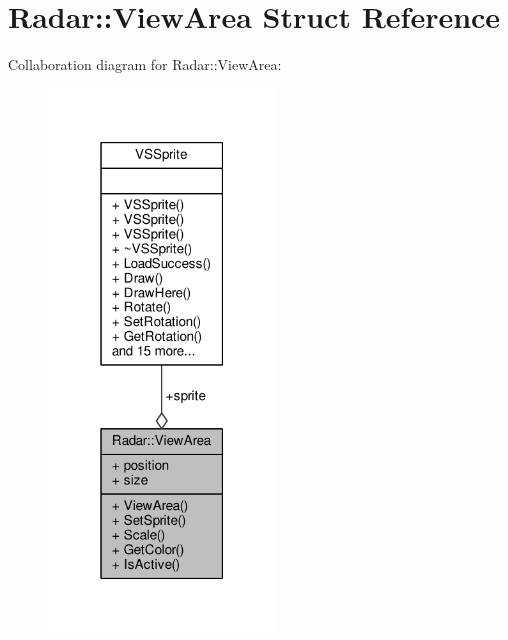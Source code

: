 \hypertarget{structRadar_1_1ViewArea}{}\section{Radar\+:\+:View\+Area Struct Reference}
\label{structRadar_1_1ViewArea}


Collaboration diagram for Radar\+:\+:View\+Area\+:
\nopagebreak
\begin{figure}[H]
\begin{center}
\leavevmode
\includegraphics[width=171pt]{d6/d18/structRadar_1_1ViewArea__coll__graph}
\end{center}
\end{figure}
